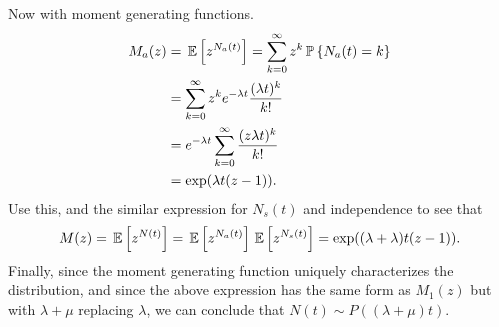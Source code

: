\begin{question}
\begin{solution}
Now   with moment generating functions.
      \begin{equation*}
        \begin{split}
          M_a(z) 
&= \,\mathbb{E}\left[z^{N_a(t)}\right] = \sum_{k=0}^\infty z^k \,\mathbb{P}\left\{N_a(t) = k\right\} \\
&= \sum_{k=0}^\infty z^k e^{-\lambda t} \frac{(\lambda t)^k}{k!} \\
&= e^{-\lambda t} \sum_{k=0}^\infty  \frac{(z \lambda t)^k}{k!} \\
&=\exp(\lambda t (z-1)). 
        \end{split}
      \end{equation*}
      Use this, and the similar expression for $N_s(t)$ and
      independence to see that
\begin{equation*}
M(z) = \,\mathbb{E}\left[z^{N(t)}\right] = \,\mathbb{E}\left[z^{N_a(t)}\right] \,\mathbb{E}\left[z^{N_s(t)}\right] = \exp((\lambda +\lambda)t (z-1)). 
\end{equation*}
Finally, since the moment generating function uniquely characterizes
the distribution, and since the above expression has the same form as
$M_1(z)$ but with $\lambda+\mu$ replacing $\lambda$, we can conclude that $N(t)\sim P((\lambda +\mu) t)$.
    \end{solution}
\end{question}


